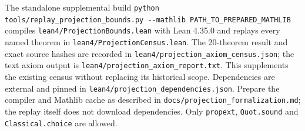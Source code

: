 \documentclass[
  11pt,
]{article}
\begin{document}
The standalone supplemental build \texttt{python tools/\allowbreak{}replay\_\allowbreak{}projection\_\allowbreak{}bounds.py -\allowbreak{}-\allowbreak{}mathlib PATH\_\allowbreak{}TO\_\allowbreak{}PREPARED\_\allowbreak{}MATHLIB}
compiles \texttt{lean4/\allowbreak{}ProjectionBounds.lean} with Lean 4.35.0 and replays every named
theorem in \texttt{lean4/\allowbreak{}ProjectionCensus.lean}. The 20-theorem result and exact source
hashes are recorded in \texttt{lean4/\allowbreak{}projection\_\allowbreak{}axiom\_\allowbreak{}census.json}; the text axiom
output is \texttt{lean4/\allowbreak{}projection\_\allowbreak{}axiom\_\allowbreak{}report.txt}. This supplements the existing
census without replacing its historical scope. Dependencies are external and pinned in \texttt{lean4/\allowbreak{}projection\_\allowbreak{}dependencies.json}.
Prepare the compiler and Mathlib cache as described in
\texttt{docs/\allowbreak{}projection\_\allowbreak{}formalization.md}; the replay itself does not download dependencies. Only \texttt{propext}, \texttt{Quot.sound} and \texttt{Classical.choice} are allowed.
\end{document}
